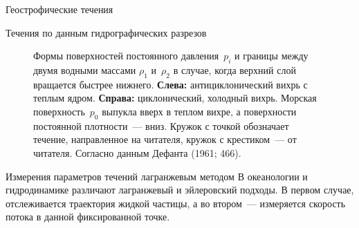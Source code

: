 \begin{chapter}{Геострофические течения}
\begin{section}{Течения по данным гидрографических разрезов}
\begin{figure}[h!]
\caption{Формы поверхностей постоянного давления~$p_i$ и границы между
двумя водными массами $\rho_1$ и~$\rho_2$ в случае, когда верхний слой
вращается быстрее нижнего. \textbf{Слева:} антициклонический вихрь с теплым
ядром. \textbf{Справа:} циклонический, холодный вихрь. Морская поверхность~$p_0$
выпукла вверх в теплом вихре, а поверхности постоянной плотности~---
вниз. Кружок с точкой обозначает течение, направленное на читателя,
кружок с крестиком~--- от читателя. Согласно данным Дефанта (1961; 466).}
\label{fig:rings}
\end{figure}
%
\end{section}

\begin{section}{Измерения параметров течений лагранжевым методом}
В океанологии и гидродинамике различают лагранжевый и эйлеровский
подходы. В первом случае, отслеживается траектория жидкой частицы, а
во втором~--- измеряется скорость потока в данной фиксированной
точке.
%


\end{section}
\end{chapter}
